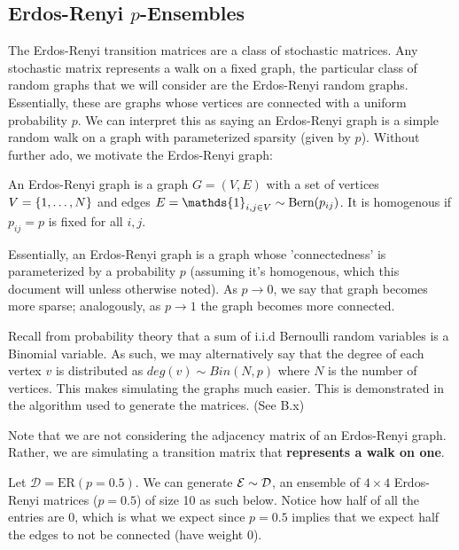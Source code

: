 \subsection{Erdos-Renyi $p$-Ensembles}

The Erdos-Renyi transition matrices are a class of stochastic matrices. Any stochastic matrix represents a walk on a fixed graph, the particular class of random graphs that we will consider are the Erdos-Renyi random graphs. Essentially, these are graphs whose vertices are connected with a uniform probability $p$. We can interpret this as saying an Erdos-Renyi graph is a simple random walk on a graph with parameterized sparsity (given by $p$). Without further ado, we motivate the Erdos-Renyi graph:

\begin{definition}
An Erdos-Renyi graph is a graph $G = (V,E)$ with a set of vertices $V = \{\oneto[N]\}$ and edges $E = \mathds{1}_{i,j \in V} \sim \Bern(p_{ij})$. It is homogenous if $p_{ij} = p$ is fixed for all $i, j$.
\end{definition}

Essentially, an Erdos-Renyi graph is a graph whose 'connectedness' is parameterized by a probability $p$ (assuming it's homogenous, which this document will unless otherwise noted).
As $p \to 0$, we say that graph becomes more sparse; analogously, as $p \to 1$ the graph becomes more connected.

Recall from probability theory that a sum of i.i.d Bernoulli random variables is a Binomial variable.
As such, we may alternatively say that the degree of each vertex $v$ is distributed as $deg(v) \sim Bin(N,p)$ where $N$ is the number of vertices.
This makes simulating the graphs much easier. This is demonstrated in the algorithm used to generate the matrices.  (See B.x)

\ALGerdos

\begin{warning}
Note that we are not considering the adjacency matrix of an Erdos-Renyi graph. Rather, we are simulating a transition matrix that \textbf{represents a walk on one}.
\end{warning}

\begin{code}[Erdos-Renyi p = 0.5 Ensemble]
Let $\mathcal{D} = \text{ER}(p = 0.5)$. We can generate $\Ens \sim \D$, an ensemble of $4 \times 4$ Erdos-Renyi matrices ($p = 0.5$) of size 10 as such below.
Notice how half of all the entries are $0$, which is what we expect since $p = 0.5$ implies that we expect half the edges to not be connected (have weight 0).
\end{code}

